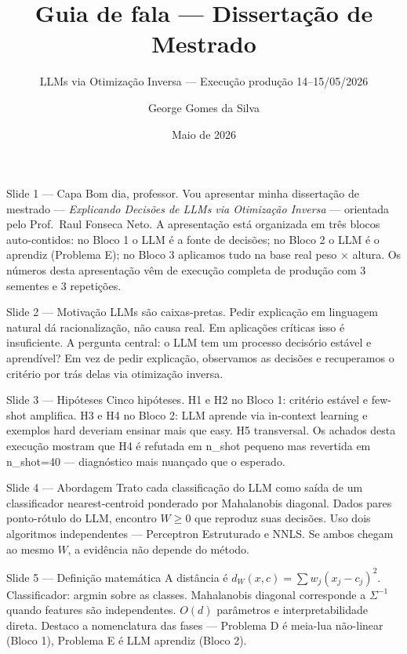 \documentclass[aspectratio=169,10pt]{beamer}
\title[Guia de fala]{Guia de fala --- Disserta\c{c}\~ao de Mestrado}
\subtitle{LLMs via Otimiza\c{c}\~ao Inversa --- Execu\c{c}\~ao produ\c{c}\~ao 14--15/05/2026}
\author{George Gomes da Silva}
\date{Maio de 2026}
\begin{document}

\begin{frame}{Slide 1 --- Capa}
\footnotesize
Bom dia, professor. Vou apresentar minha disserta\c{c}\~ao de mestrado --- \emph{Explicando Decis\~oes de LLMs via Otimiza\c{c}\~ao Inversa} --- orientada pelo Prof.\ Raul Fonseca Neto. A apresenta\c{c}\~ao est\'a organizada em tr\^es blocos auto-contidos: no Bloco 1 o LLM \'e a fonte de decis\~oes; no Bloco 2 o LLM \'e o aprendiz (Problema E); no Bloco 3 aplicamos tudo na base real peso × altura. Os n\'umeros desta apresenta\c{c}\~ao v\^em de execu\c{c}\~ao completa de produ\c{c}\~ao com 3 sementes e 3 repeti\c{c}\~oes.
\end{frame}

\begin{frame}{Slide 2 --- Motiva\c{c}\~ao}
\footnotesize
LLMs s\~ao caixas-pretas. Pedir explica\c{c}\~ao em linguagem natural d\'a racionaliza\c{c}\~ao, n\~ao causa real. Em aplica\c{c}\~oes cr\'iticas isso \'e insuficiente. A pergunta central: o LLM tem um processo decis\'orio est\'avel e aprend\'ivel? Em vez de pedir explica\c{c}\~ao, observamos as decis\~oes e recuperamos o crit\'erio por tr\'as delas via otimiza\c{c}\~ao inversa.
\end{frame}

\begin{frame}{Slide 3 --- Hip\'oteses}
\footnotesize
Cinco hip\'oteses. H1 e H2 no Bloco 1: crit\'erio est\'avel e few-shot amplifica. H3 e H4 no Bloco 2: LLM aprende via in-context learning e exemplos hard deveriam ensinar mais que easy. H5 transversal. Os achados desta execu\c{c}\~ao mostram que H4 \'e refutada em n\_shot pequeno mas revertida em n\_shot=40 --- diagn\'ostico mais nuan\c{c}ado que o esperado.
\end{frame}

\begin{frame}{Slide 4 --- Abordagem}
\footnotesize
Trato cada classifica\c{c}\~ao do LLM como sa\'ida de um classificador nearest-centroid ponderado por Mahalanobis diagonal. Dados pares ponto-r\'otulo do LLM, encontro $W \geq 0$ que reproduz suas decis\~oes. Uso dois algoritmos independentes --- Perceptron Estruturado e NNLS. Se ambos chegam ao mesmo $W$, a evid\^encia n\~ao depende do m\'etodo.
\end{frame}

\begin{frame}{Slide 5 --- Defini\c{c}\~ao matem\'atica}
\footnotesize
A dist\^ancia \'e $d_W(x,c) = \sum w_j (x_j - c_j)^2$. Classificador: argmin sobre as classes. Mahalanobis diagonal corresponde a $\Sigma^{-1}$ quando features s\~ao independentes. $O(d)$ par\^ametros e interpretabilidade direta. Destaco a nomenclatura das fases --- Problema D \'e meia-lua n\~ao-linear (Bloco 1), Problema E \'e LLM aprendiz (Bloco 2).
\end{frame}
\end{document}
